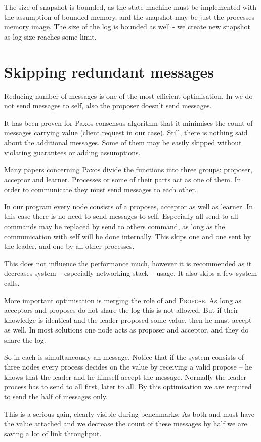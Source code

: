 The size of snapshot is bounded, as the state machine must be implemented with the assumption of bounded memory, and the snapshot may be just the processes memory image. The size of the log is bounded as well - we create new snapshot as log size reaches some limit.


\section{Skipping redundant messages}
Reducing number of messages is one of the most efficient optimisation. In \paxosJava we do not send messages to self, also the proposer doesn't send \accept messages.

It has been proven for Paxos consensus algorithm that it minimises the count of messages carrying value (client request in our case). Still, there is nothing said about the additional messages. Some of them may be easily skipped without violating guarantees or adding assumptions.


Many papers concerning Paxos divide the functions into three groups: proposer, acceptor and learner. Processes or some of their parts act as one of them. In order to communicate they must send messages to each other.

In our program every node consists of a proposes, acceptor as well as learner. In this case there is no need to send messages to self. Especially all send-to-all commands may be replaced by send to others command, as long as the communication with self will be done internally. This skips one \accept and one \propose sent by the leader, and one \accept by all other processes.

This does not influence the performance much, however it is recommended as it decreases system -- especially networking stack -- usage. It also skips a few system calls.


More important optimisation is merging the role of \accept and \textsc{Propose}. As long as acceptors and proposes do not share the log this is not allowed. But if their knowledge is identical and the leader proposed some value, then he must accept as well.  In most solutions one node acts as proposer and acceptor, and they do share the log.

So in \paxosJava each \propose is simultaneously an \accept message. Notice that if the system consists of three nodes every process decides on the value by receiving a valid propose -- he knows that the leader and he himself accept the message. Normally the leader process has to send \propose to all first, later \accept to all. By this optimisation we are required to send the half of messages only.

This is a serious gain, clearly visible during benchmarks. As both \accept and \propose must have the value attached and we decrease the count of these messages by half we are saving a lot of link throughput.
